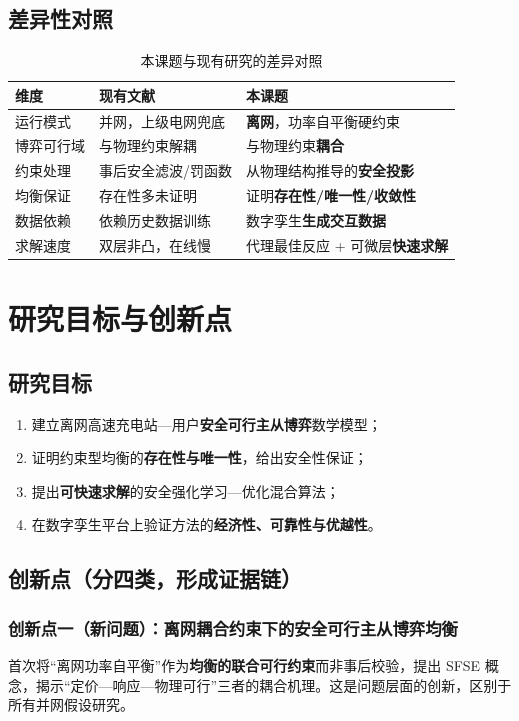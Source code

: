 \documentclass[UTF8,a4paper,11pt]{ctexart}
\begin{document}
\subsection{差异性对照}
\begin{table}[htbp]
\centering
\small
\caption{本课题与现有研究的差异对照}
\label{tab:diff}
\begin{tabular}{p{2.5cm} p{5.4cm} p{5.4cm}}
\toprule
\textbf{维度} & \textbf{现有文献} & \textbf{本课题}\\
\midrule
运行模式 & 并网，上级电网兜底 & \textbf{离网}，功率自平衡硬约束\\
博弈可行域 & 与物理约束解耦 & 与物理约束\textbf{耦合}\\
约束处理 & 事后安全滤波/罚函数 & 从物理结构推导的\textbf{安全投影}\\
均衡保证 & 存在性多未证明 & 证明\textbf{存在性/唯一性/收敛性}\\
数据依赖 & 依赖历史数据训练 & 数字孪生\textbf{生成交互数据}\\
求解速度 & 双层非凸，在线慢 & 代理最佳反应 + 可微层\textbf{快速求解}\\
\bottomrule
\end{tabular}
\end{table}

\section{研究目标与创新点}

\subsection{研究目标}
\begin{enumerate}
  \item 建立离网高速充电站—用户\textbf{安全可行主从博弈}数学模型；
  \item 证明约束型均衡的\textbf{存在性与唯一性}，给出安全性保证；
  \item 提出\textbf{可快速求解}的安全强化学习—优化混合算法；
  \item 在数字孪生平台上验证方法的\textbf{经济性、可靠性与优越性}。
\end{enumerate}

\subsection{创新点（分四类，形成证据链）}

\subsubsection*{创新点一（新问题）：离网耦合约束下的安全可行主从博弈均衡}
首次将“离网功率自平衡”作为\textbf{均衡的联合可行约束}而非事后校验，提出 SFSE 概念，揭示“定价—响应—物理可行”三者的耦合机理。这是问题层面的创新，区别于所有并网假设研究。
\end{document}
